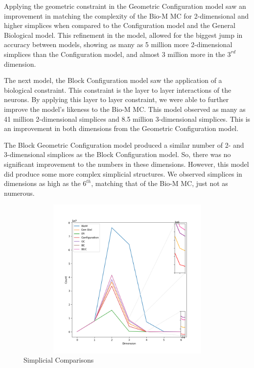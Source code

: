 Applying the geometric constraint in the Geometric Configuration model saw an improvement in matching the complexity of the Bio-M MC for 2-dimensional and higher simplices when compared to the Configuration model and the General Biological model. This refinement in the model, allowed for the biggest jump in accuracy between models, showing as many as 5 million more 2-dimensional simplices than the Configuration model, and almost 3 million more in the $3^{rd}$ dimension. 

The next model, the Block Configuration model saw the application of a biological constraint. This constraint is the layer to layer interactions of the neurons. By applying this layer to layer constraint, we were able to further improve the model's likeness to the Bio-M MC. This model observed as many as 41 million 2-dimensional simplices and 8.5 million 3-dimensional simplices. This is an improvement in both dimensions from the Geometric Configuration model. 

The Block Geometric Configuration model produced a similar number of 2- and 3-dimensional simplices as the Block Configuration model. So, there was no significant improvement to the numbers in these dimensions. However, this model did produce some more complex simplicial structures. We observed simplices in dimensions as high as the $6^{th}$, matching that of the Bio-M MC, just not as numerous.

\begin{figure}[H]
\begin{center}
\captionsetup{justification=centering}
\includegraphics[height=8cm,width=12cm]{graph/simplices_zoomed.png}
\caption{Simplicial Comparisons}
\end{center}
\end{figure}



